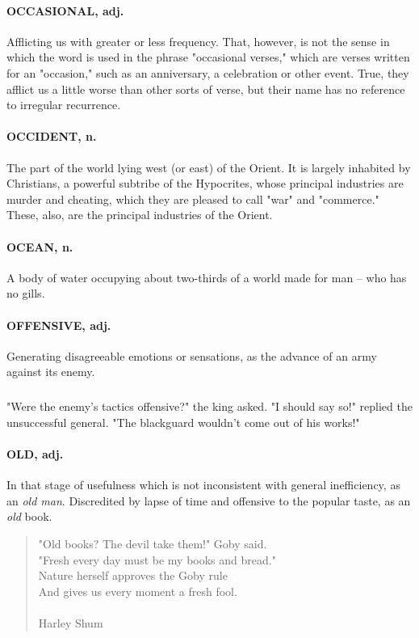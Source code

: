 \documentclass[11pt]{article}
\begin{document}
\paragraph{OCCASIONAL, adj.}  Afflicting us with greater or less frequency.  That,
however, is not the sense in which the word is used in the phrase
"occasional verses," which are verses written for an "occasion," such
as an anniversary, a celebration or other event.  True, they afflict
us a little worse than other sorts of verse, but their name has no
reference to irregular recurrence.

\paragraph{OCCIDENT, n.}  The part of the world lying west (or east) of the
Orient.  It is largely inhabited by Christians, a powerful subtribe of
the Hypocrites, whose principal industries are murder and cheating,
which they are pleased to call "war" and "commerce."  These, also, are
the principal industries of the Orient.

\paragraph{OCEAN, n.}  A body of water occupying about two-thirds of a world made
for man -- who has no gills.

\paragraph{OFFENSIVE, adj.}  Generating disagreeable emotions or sensations, as
the advance of an army against its enemy.
\subparagraph{}   "Were the enemy's tactics offensive?" the king asked.  "I should
say so!" replied the unsuccessful general.  "The blackguard wouldn't
come out of his works!"

\paragraph{OLD, adj.}  In that stage of usefulness which is not inconsistent with
general inefficiency, as an {\em old man}.  Discredited by lapse of time
and offensive to the popular taste, as an {\em old} book.

\begin{quote}   "Old books?  The devil take them!" Goby said. \\
  "Fresh every day must be my books and bread." \\
  Nature herself approves the Goby rule \\
  And gives us every moment a fresh fool. \\
 \\
Harley Shum \end{quote}
\end{document}
